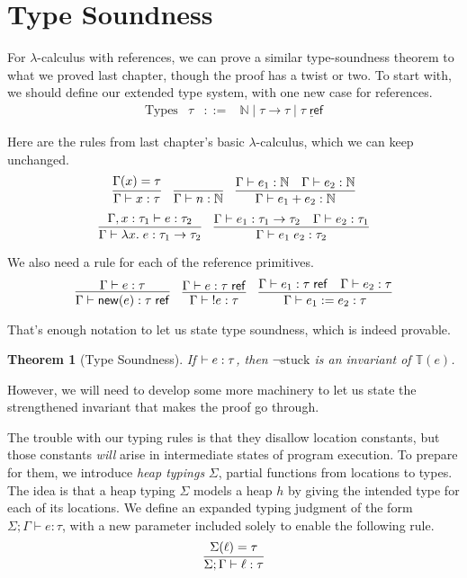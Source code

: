 \documentclass{amsbook}
\newtheorem{theorem}{Theorem}[chapter]
\theoremstyle{definition}
\theoremstyle{remark}
\numberwithin{section}{chapter}
\numberwithin{equation}{chapter}
\begin{document}
\section{Type Soundness}

\newcommand{\reft}[1]{#1 \; \mathsf{ref}}

For $\lambda$-calculus with references, we can prove a similar type-soundness theorem to what we proved last chapter, though the proof has a twist or two.
To start with, we should define our extended type system, with one new case for references.
$$\begin{array}{rrcl}
  \textrm{Types} & \tau &::=& \mathbb N \mid \tau \to \tau \mid \underline{\reft{\tau}}
\end{array}$$

Here are the rules from last chapter's basic $\lambda$-calculus, which we can keep unchanged.
$$\infer{\hasty{\Gamma}{x}{\tau}}{
  \msel{\Gamma}{x} = \tau
}
\quad \infer{\hasty{\Gamma}{n}{\mathbb N}}{}
\quad \infer{\hasty{\Gamma}{e_1 + e_2}{\mathbb N}}{
    \hasty{\Gamma}{e_1}{\mathbb N}
    & \hasty{\Gamma}{e_2}{\mathbb N}
}$$
$$\infer{\hasty{\Gamma}{\lambda x. \; e}{\tau_1 \to \tau_2}}{
  \hasty{\Gamma, x : \tau_1}{e}{\tau_2}
}
\quad \infer{\hasty{\Gamma}{e_1 \; e_2}{\tau_2}}{
  \hasty{\Gamma}{e_1}{\tau_1 \to \tau_2}
  & \hasty{\Gamma}{e_2}{\tau_1}
}$$

We also need a rule for each of the reference primitives.
$$\infer{\hasty{\Gamma}{\newref{e}}{\reft{\tau}}}{
  \hasty{\Gamma}{e}{\tau}
}
\quad \infer{\hasty{\Gamma}{\; \readref{e}}{\tau}}{
    \hasty{\Gamma}{e}{\reft{\tau}}
}
\quad \infer{\hasty{\Gamma}{\writeref{e_1}{e_2}}{\tau}}{
  \hasty{\Gamma}{e_1}{\reft{\tau}}
  & \hasty{\Gamma}{e_2}{\tau}
}$$

That's enough notation to let us state type soundness, which is indeed provable.

\begin{theorem}[Type Soundness]
  If $\vdash e : \tau$, then $\neg \textrm{stuck}$ is an invariant of $\mathbb T(e)$.
\end{theorem}

However, we will need to develop some more machinery to let us state the strengthened invariant that makes the proof go through.

\newcommand{\rhasty}[4]{#1; #2 \vdash #3 : #4}

The trouble with our typing rules is that they disallow location constants, but those constants \emph{will} arise in intermediate states of program execution.
To prepare for them, we introduce \emph{heap typings} $\Sigma$, partial functions from locations to types.
The idea is that a heap typing $\Sigma$ models a heap $h$ by giving the intended type for each of its locations.
We define an expanded typing judgment of the form $\rhasty{\Sigma}{\Gamma}{e}{\tau}$, with a new parameter included solely to enable the following rule.
$$\infer{\rhasty{\Sigma}{\Gamma}{\ell}{\tau}}{
  \msel{\Sigma}{\ell} = \tau
}$$
\end{document}
